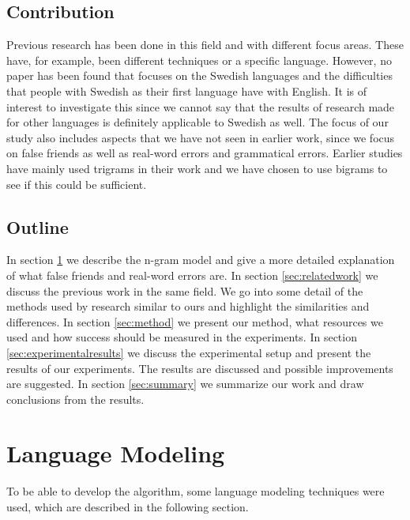 \documentclass[a4paper,12pt]{article}
\begin{document}
\subsection{Contribution}
\label{sec:contribution}
Previous research has been done in this field and with different focus areas. These have, for example, been different techniques or a specific language. However, no paper has been found that focuses on the Swedish languages and the difficulties that people with Swedish as their first language have with English. It is of interest to investigate this since we cannot say that the results of research made for other languages is definitely applicable to Swedish as well. The focus of our study also includes aspects that we have not seen in earlier work, since we focus on false friends as well as real-word errors and grammatical errors. Earlier studies have mainly used trigrams in their work and we have chosen to use bigrams to see if this could be sufficient. 

\subsection{Outline}
\label{sec:outline}
In section \ref{sec:languagemodeling} we describe the n-gram model and give a more detailed explanation of what false friends and real-word errors are.  In section \ref{sec:relatedwork} we discuss the previous work in the same field. We go into some detail of the methods used by research similar to ours and highlight the similarities and differences. In section \ref{sec:method} we present our method, what resources we used and how success should be measured in the experiments. In section \ref{sec:experimentalresults} we discuss the experimental setup and present the results of our experiments. The results are discussed and possible improvements are suggested. In section \ref{sec:summary} we summarize our work and draw conclusions from the results. 

\section{Language Modeling}
\label{sec:languagemodeling}
To be able to develop the algorithm, some language modeling techniques were used, which are described in the following section.
\end{document}
